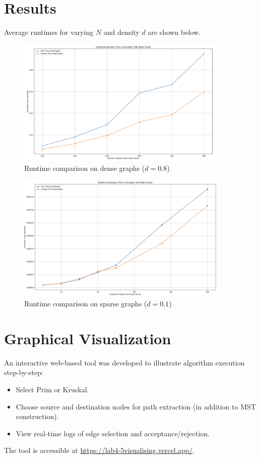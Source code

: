 \documentclass[12pt]{article}
\begin{document}
\section*{Results}
Average runtimes for varying $N$ and density $d$ are shown below.

\begin{figure}[h]
    \centering
    \includegraphics[width=0.9\textwidth]{images/more_nodes.png}
    \caption{Runtime comparison on dense graphs ($d=0.8$)}
    \label{fig:dense}
\end{figure}

\begin{figure}[h]
    \centering
    \includegraphics[width=0.9\textwidth]{images/less_nodes.png}
    \caption{Runtime comparison on sparse graphs ($d=0.1$)}
    \label{fig:sparse}
\end{figure}

\clearpage
\section*{Graphical Visualization}
An interactive web-based tool was developed to illustrate algorithm execution step-by-step:
\begin{itemize}
  \item Select Prim or Kruskal.
  \item Choose source and destination nodes for path extraction (in addition to MST construction).
  \item View real-time logs of edge selection and acceptance/rejection.
\end{itemize}
The tool is accessible at \url{https://lab4-5visualising.vercel.app/}.
\end{document}
